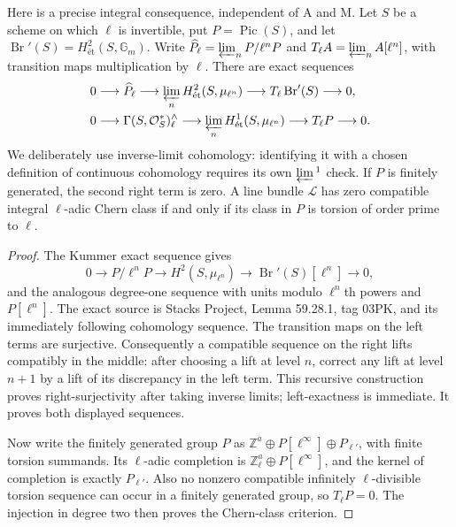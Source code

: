 Here is a precise integral consequence, independent of A and M. Let $S$
be a scheme on which $\ell$ is invertible, put $P=\operatorname{Pic}(S)$,
and let $\operatorname{Br}'(S)=H^2_{\text{ét}}(S,\mathbb G_m)$.
Write $\widehat P_\ell=\varprojlim_nP/\ell^nP$ and
$T_\ell A=\varprojlim_n A[\ell^n]$, with transition maps multiplication
by $\ell$. There are exact sequences
\begin{align*}
 0&\longrightarrow\widehat P_\ell
   \longrightarrow\varprojlim_nH^2_{\text{ét}}(S,\mu_{\ell^n})
   \longrightarrow T_\ell\operatorname{Br}'(S)\longrightarrow0,\\
 0&\longrightarrow\Gamma(S,\mathcal O_S^*)^{\wedge}_\ell
   \longrightarrow\varprojlim_nH^1_{\text{ét}}(S,\mu_{\ell^n})
   \longrightarrow T_\ell P\longrightarrow0.
\end{align*}
We deliberately use inverse-limit cohomology: identifying it with a
chosen definition of continuous cohomology requires its own
$\varprojlim{}^1$ check. If $P$ is finitely generated, the second right
term is zero. A line bundle $\mathcal L$ has zero compatible integral
$\ell$-adic Chern class if and only if its class in $P$ is torsion of
order prime to $\ell$.

\begin{proof}
The Kummer exact sequence gives
\[
 0\longrightarrow P/\ell^nP
 \longrightarrow H^2(S,\mu_{\ell^n})
 \longrightarrow\operatorname{Br}'(S)[\ell^n]\longrightarrow0,
\]
and the analogous degree-one sequence with units modulo $\ell^n$th
powers and $P[\ell^n]$. The exact source is Stacks Project,
Lemma 59.28.1, tag 03PK, and its immediately following cohomology
sequence. The transition maps on the left terms are surjective.
Consequently a compatible sequence on the right lifts compatibly in
the middle: after choosing a lift at level $n$, correct any lift at
level $n+1$ by a lift of its discrepancy in the left term. This recursive
construction proves right-surjectivity after taking inverse limits;
left-exactness is immediate. It proves both displayed sequences.

Now write the finitely generated group $P$ as
$\mathbb Z^a\oplus P[\ell^\infty]\oplus P_{\ell'}$, with finite torsion
summands. Its $\ell$-adic completion is
$\mathbb Z_\ell^a\oplus P[\ell^\infty]$, and the kernel of completion
is exactly $P_{\ell'}$. Also no nonzero compatible infinitely
$\ell$-divisible torsion sequence can occur in a finitely generated
group, so $T_\ell P=0$. The injection in degree two then proves the
Chern-class criterion.
\end{proof}

